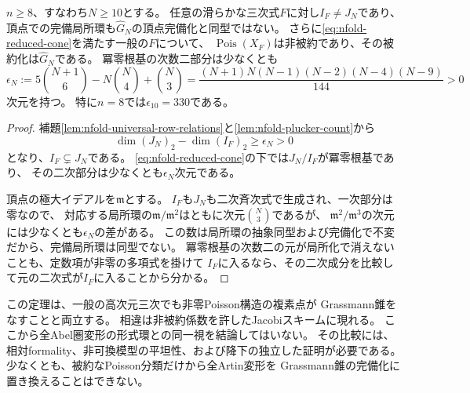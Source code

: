 \begin{theorem}[八次元以上のJacobiスキームの非被約性]
\label{thm:nfold-high-dimensional-nilpotents}
$n\ge8$、すなわち$N\ge10$とする。
任意の滑らかな三次式$F$に対し$I_F\ne J_N$であり、
頂点での完備局所環も$\widehat G_N$の頂点完備化と同型ではない。
さらに\eqref{eq:nfold-reduced-cone}を満たす一般の$F$について、
$\operatorname{Pois}(X_F)$は非被約であり、その被約化は$\widehat G_N$である。
冪零根基の次数二部分は少なくとも
\begin{equation}\label{eq:nfold-nilpotent-lower-bound}
 \epsilon_N:=5\binom{N+1}{6}-N\binom N4+\binom N3
 =\frac{(N+1)N(N-1)(N-2)(N-4)(N-9)}{144}>0
\end{equation}
次元を持つ。
特に$n=8$では$\epsilon_{10}=330$である。
\end{theorem}
\begin{proof}
補題\ref{lem:nfold-universal-row-relations}と\ref{lem:nfold-plucker-count}から
\[
 \dim (J_N)_2-\dim (I_F)_2\ge\epsilon_N>0
\]
となり、$I_F\subsetneq J_N$である。
\eqref{eq:nfold-reduced-cone}の下では$J_N/I_F$が冪零根基であり、
その二次部分は少なくとも$\epsilon_N$次元である。

頂点の極大イデアルを$\mathfrak m$とする。
$I_F$も$J_N$も二次斉次式で生成され、一次部分は零なので、
対応する局所環の$\mathfrak m/\mathfrak m^2$はともに次元$\binom N3$であるが、
$\mathfrak m^2/\mathfrak m^3$の次元には少なくとも$\epsilon_N$の差がある。
この数は局所環の抽象同型および完備化で不変だから、完備局所環は同型でない。
冪零根基の次数二の元が局所化で消えないことも、定数項が非零の多項式を掛けて
$I_F$に入るなら、その二次成分を比較して元の二次式が$I_F$に入ることから分かる。
\end{proof}

\begin{remark}[被約な分類と形式変形]
この定理は、一般の高次元三次でも非零Poisson構造の複素点が
Grassmann錐をなすことと両立する。
相違は非被約係数を許したJacobiスキームに現れる。
ここから全Abel圏変形の形式環との同一視を結論してはいない。
その比較には、相対formality、非可換模型の平坦性、および降下の独立した証明が必要である。
少なくとも、被約なPoisson分類だけから全Artin変形を
Grassmann錐の完備化に置き換えることはできない。
\end{remark}

